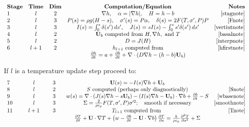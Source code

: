 \documentclass{amsart}%
\theoremstyle{plain}
\theoremstyle{definition}
\theoremstyle{remark}
\newcommand{\ddt}[1]{\ensuremath{\frac{\partial #1}{\partial t}}}
\newcommand{\dds}[1]{\ensuremath{\frac{\partial #1}{\partial s}}}
\newcommand{\dddsds}[1]{\ensuremath{\frac{\partial^2 #1}{\partial s^2}}}
\newcommand{\diverg}{\nabla\cdot}
\newcommand{\grad}{\nabla}
\newcommand{\bU}{{\mathbf{U}}}
\begin{document}
\renewcommand{\arraystretch}{2}
$$\begin{array}{lcccr}
\textbf{Stage} & \textbf{Time} & \textbf{Dim} & \textbf{Computation/Equation} & \textbf{Notes} \\
1 & l & 2 & \grad h,\quad \alpha=|\grad h|, \quad H=h-b & \eqref{stagnote} \\
2 & l & 3 & P(s)=\rho g (H-s), \quad \sigma'(s)=P\alpha, \quad \delta(s)=2 F(T,\sigma',P) P & \eqref{Fnote} \\
3 & l & 3 & I(s)=\int_0^s \delta(s')\,ds', \quad J(s)=sI(s)-\int_0^s s'\delta(s')\,ds' & \eqref{vertintnote}\\
4 & l & 2 & \bU_b \text{ computed from } H, \grad h, \text{ and } T& \eqref{basalnote} \\
5 & l & 2 & D=J(H) & \eqref{interpnote} \\
6 & l+1 & 2 & h_{l+1} \text{ computed from} & \eqref{hfirstnote} \\
 &  &  & \ddt{h}= a + \ddt{b} + \diverg \left(D \grad h - (h-b)\bU_b\right) & \\
\end{array}$$

\noindent If $l$ is a temperature update step proceed to:
$$\begin{array}{lcccr}
7\phantom{tage} & \phantom{bob}l\phantom{bob} & \phantom{bo}3\phantom{bo} & \bU(s)=- I(s) \grad h+ \bU_b & \\
8 & l & 2 & S \text{ computed (perhaps only diagnostically)} & \eqref{Snote} \\
9 & l & 3 & w(s)=\diverg \left(J(s)\grad h-s\bU_b\right)-\left(I(s)\grad h-\bU_b\right)\cdot\grad b + \ddt{b}-S & \eqref{wbasenote} \\
10 & l & 3 & \Sigma = \frac{2}{\rho c_p} F(T,\sigma',P) \sigma'^2; \quad \text{smooth if necessary} & \eqref{smoothnote}\\
11 & l+1 & 3 & T_{l+1} \text{ computed from } & \eqref{Tnote} \\
 &  &  & \ddt{T}+\bU\cdot\grad T + \left(w-\ddt{b}-\bU\cdot\grad b\right)\dds{T} = \frac{k}{\rho c_p} \dddsds{T} + \Sigma & \\
\end{array}$$
\end{document}
